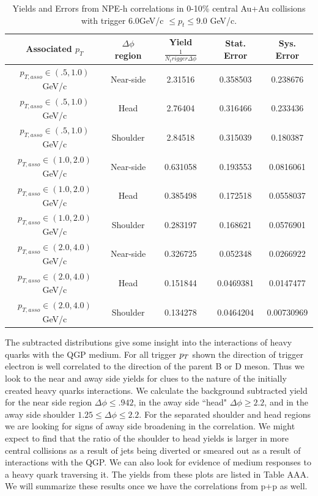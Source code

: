 \begin{table}
\centering
\begin{tabular}{|c|c|c|c|c|}
\hline
Associated $p_T$	& $\Delta\phi$ region & Yield $\frac{1}{N_trigger \Delta\phi}$ & Stat. Error & Sys. Error\\
\hline
$p_{T,asso} \in(.5, 1.0)$ GeV/c  & Near-side & 2.31516 & 0.358503 & 0.238676 \\
\hline
$p_{T,asso} \in(.5, 1.0)$ GeV/c  & Head & 2.76404 & 0.316466 & 0.233436 \\
\hline
$p_{T,asso} \in(.5, 1.0)$ GeV/c  & Shoulder & 2.84518 & 0.315039 & 0.180387 \\
\hline
$p_{T,asso} \in(1.0, 2.0)$ GeV/c  & Near-side & 0.631058 & 0.193553 & 0.0816061 \\
\hline
$p_{T,asso} \in(1.0, 2.0)$ GeV/c  & Head & 0.385498 & 0.172518 & 0.0558037 \\
\hline
$p_{T,asso} \in(1.0, 2.0)$ GeV/c  & Shoulder & 0.283197 & 0.168621 & 0.0576901 \\
\hline
$p_{T,asso} \in(2.0, 4.0)$ GeV/c  & Near-side & 0.326725 & 0.052348 & 0.0266922 \\
\hline
$p_{T,asso} \in(2.0, 4.0)$ GeV/c  & Head & 0.151844 & 0.0469381 & 0.0147477 \\
\hline
$p_{T,asso} \in(2.0, 4.0)$ GeV/c  & Shoulder & 0.134278 & 0.0464204 & 0.00730969 \\
\hline
\end{tabular}
\caption[Yields and Errors in Au+Au Correlations, 0-10\%, High Trigger]{Yields and Errors from NPE-h correlations in 0-10\% central Au+Au collisions with trigger $6.0 $GeV/c $\leq p_t \leq 9.0$ GeV/c.}
\label{tab:AuAuYieldCentHigh}
\end{table} 

The subtracted distributions give some insight into the interactions of heavy quarks with the QGP medium. For all trigger $p_{T}$ shown the direction of trigger electron is well correlated to the direction of the parent B or D meson. Thus we look to the near and away side yields for clues to the nature of the initially created heavy quarks interactions. We calculate the background subtracted yield for the near side region $\Delta\phi \leq .942$, in the away side ``head" $\Delta\phi \geq 2.2$, and in the away side shoulder $1.25 \leq \Delta\phi \leq 2.2$. For the separated shoulder and head regions we are looking for signs of away side broadening in the correlation. We might expect to find that the ratio of the shoulder to head yields is larger in more central collisions as a result of jets being diverted or smeared out as a result of interactions with the QGP. We can also look for evidence of medium responses to a heavy quark traversing it. The yields from these plots are listed in Table AAA. We will summarize these results once we have the correlations from p+p as well. 

